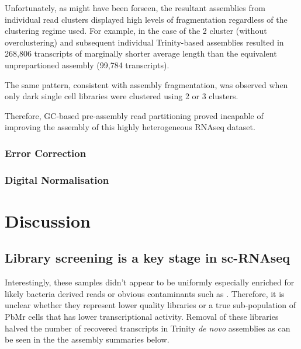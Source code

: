 Unfortunately, as might have been forseen, the resultant assemblies from individual
read clusters displayed high levels of fragmentation regardless of the clustering
regime used.  For example, in the case of the 2 cluster (without overclustering) 
and subsequent individual Trinity-based assemblies resulted in 268,806 transcripts
of marginally shorter average length than the equivalent unprepartioned assembly
(99,784 transcripts).

The same pattern, consistent with assembly fragmentation, 
was observed when only dark single cell libraries were clustered using 
2 or 3 clusters. 

Therefore, GC-based pre-assembly read partitioning proved incapable of improving
the assembly of this highly heterogeneous RNAseq dataset.




\subsubsection{Error Correction}

\subsubsection{Digital Normalisation} 







\section{Discussion}

\subsection{Library screening is a key stage in sc-RNAseq}


Interestingly, these samples didn't appear to be uniformly especially enriched for likely bacteria derived reads or obvious contaminants
such as \citep{Homo sapiens}.  Therefore, it is unclear whether they represent lower quality 
libraries or a true sub-population of PbMr cells that has lower transcriptional activity.
Removal of these libraries halved the number of recovered transcripts in Trinity \textit{de novo} assemblies as can be seen in the the assembly
summaries below.



